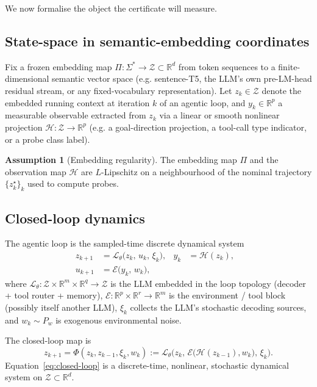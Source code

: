 \documentclass[11pt,a4paper]{article}
\theoremstyle{definition}
\newtheorem{assumption}[theorem]{Assumption}
\theoremstyle{remark}
\newcommand{\R}{\mathbb{R}}
\newcommand{\embspace}{\mathcal{Z}}
\newcommand{\agent}{\mathcal{L}_{\theta}}
\newcommand{\env}{\mathcal{E}}
\newcommand{\obs}{\mathcal{H}}
\begin{document}
We now formalise the object the certificate will measure.

\subsection{State-space in semantic-embedding coordinates}\label{ssec:embedding}

Fix a frozen embedding map $\Pi:\Sigma^{*}\to\embspace\subset\R^{d}$ from
token sequences to a finite-dimensional semantic vector space (e.g.
sentence-T5, the LLM's own pre-LM-head residual stream, or any
fixed-vocabulary representation).  Let $z_{k}\in\embspace$ denote the
embedded running context at iteration $k$ of an agentic loop, and
$y_{k}\in\R^{p}$ a measurable observable extracted from $z_{k}$ via a
linear or smooth nonlinear projection $\obs:\embspace\to\R^{p}$
(e.g. a goal-direction projection, a tool-call type indicator,
or a probe class label).

\begin{assumption}[Embedding regularity]\label{a:embedding}
The embedding map $\Pi$ and the observation map $\obs$ are
$L$-Lipschitz on a neighbourhood of the nominal trajectory
$\{z_{k}^{\star}\}_{k}$ used to compute probes.
\end{assumption}

\subsection{Closed-loop dynamics}\label{ssec:closed-loop}

The agentic loop is the sampled-time discrete dynamical system
\begin{align}
z_{k+1} &= \agent\!\big(z_{k},\,u_{k},\,\xi_{k}\big),
   & y_{k}&=\obs(z_{k}), &
\label{eq:agent}
\\
u_{k+1} &= \env\!\big(y_{k},\,w_{k}\big),
\label{eq:env}
\end{align}
where $\agent:\embspace\times\R^{m}\times\R^{q}\to\embspace$ is the LLM
embedded in the loop topology (decoder + tool router + memory),
$\env:\R^{p}\times\R^{r}\to\R^{m}$ is the environment / tool block
(possibly itself another LLM), $\xi_{k}$ collects the LLM's stochastic
decoding sources, and $w_{k}\sim P_{w}$ is exogenous environmental
noise.

The closed-loop map is
\begin{equation}\label{eq:closed-loop}
z_{k+1} = \Phi(z_{k},z_{k-1},\xi_{k},w_{k})
:= \agent\!\Big(z_{k},\,\env\big(\obs(z_{k-1}),w_{k}\big),\,\xi_{k}\Big).
\end{equation}
Equation~\eqref{eq:closed-loop} is a discrete-time, nonlinear, stochastic
dynamical system on $\embspace\subset\R^{d}$.
\end{document}
